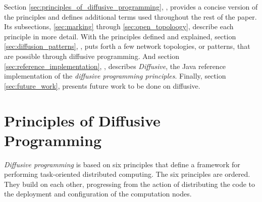 \documentclass[11pt]{scrartcl}
\begin{document}
Section \ref{sec:principles_of_diffusive_programming}, \textit{}, provides a concise version of the principles and defines additional terms used throughout the rest of the paper. Its subsections, \ref{sec:marking} through \ref{sec:open_topoloogy}, describe each principle in more detail. With the principles defined and explained, section \ref{sec:diffusion_patterns}, \textit{}, puts forth a few network topologies, or patterns, that are possible through diffusive programming. And section \ref{sec:reference_implementation}, \textit{}, describes \emph{Diffusive}, the Java reference implementation of the \emph{diffusive programming principles}. Finally, section \ref{sec:future_work}, presents future work to be done on diffusive.

%
%
\section{Principles of Diffusive Programming\label{sec:principles_of_diffusive_programming}}
\emph{Diffusive programming} is based on six principles that define a framework for performing task-oriented distributed computing. The six principles are ordered. They build on each other, progressing from the action of distributing the code to the deployment and configuration of the computation nodes.
\end{document}
